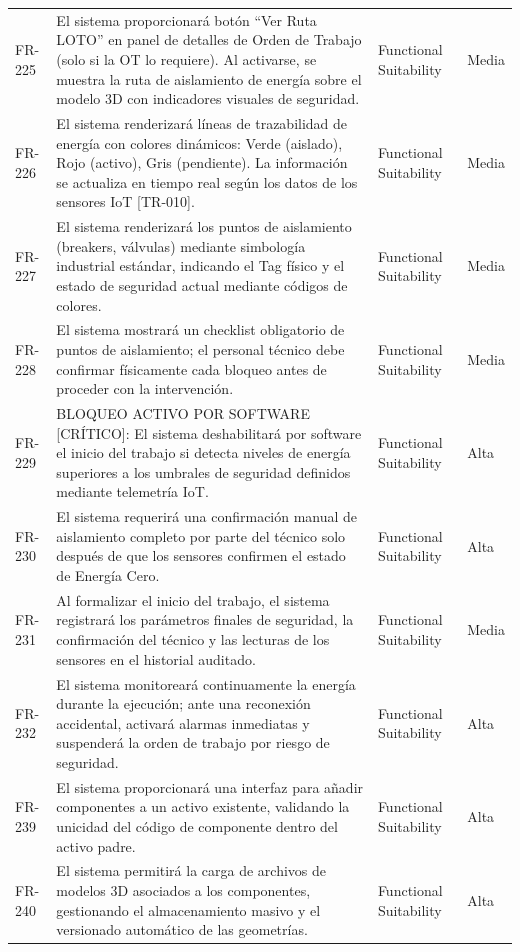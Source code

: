 \begin{longtable}{>{\raggedright\arraybackslash}p{} >{\raggedright\arraybackslash}p{} >{\raggedright\arraybackslash}p{} >{\raggedright\arraybackslash}p{}}
FR-225 & El sistema proporcionará botón ``Ver Ruta LOTO'' en panel de detalles de Orden de Trabajo (solo si la OT lo requiere). Al activarse, se muestra la ruta de aislamiento de energía sobre el modelo 3D con indicadores visuales de seguridad. & Functional Suitability & Media \\
FR-226 & El sistema renderizará líneas de trazabilidad de energía con colores dinámicos: Verde (aislado), Rojo (activo), Gris (pendiente). La información se actualiza en tiempo real según los datos de los sensores IoT [TR-010]. & Functional Suitability & Media \\
FR-227 & El sistema renderizará los puntos de aislamiento (breakers, válvulas) mediante simbología industrial estándar, indicando el Tag físico y el estado de seguridad actual mediante códigos de colores. & Functional Suitability & Media \\
FR-228 & El sistema mostrará un checklist obligatorio de puntos de aislamiento; el personal técnico debe confirmar físicamente cada bloqueo antes de proceder con la intervención. & Functional Suitability & Media \\
FR-229 & BLOQUEO ACTIVO POR SOFTWARE [CRÍTICO]: El sistema deshabilitará por software el inicio del trabajo si detecta niveles de energía superiores a los umbrales de seguridad definidos mediante telemetría IoT. & Functional Suitability & Alta \\
FR-230 & El sistema requerirá una confirmación manual de aislamiento completo por parte del técnico solo después de que los sensores confirmen el estado de Energía Cero. & Functional Suitability & Alta \\
FR-231 & Al formalizar el inicio del trabajo, el sistema registrará los parámetros finales de seguridad, la confirmación del técnico y las lecturas de los sensores en el historial auditado. & Functional Suitability & Media \\
FR-232 & El sistema monitoreará continuamente la energía durante la ejecución; ante una reconexión accidental, activará alarmas inmediatas y suspenderá la orden de trabajo por riesgo de seguridad. & Functional Suitability & Alta \\
FR-239 & El sistema proporcionará una interfaz para añadir componentes a un activo existente, validando la unicidad del código de componente dentro del activo padre. & Functional Suitability & Alta \\
FR-240 & El sistema permitirá la carga de archivos de modelos 3D asociados a los componentes, gestionando el almacenamiento masivo y el versionado automático de las geometrías. & Functional Suitability & Alta \\

\end{longtable}
